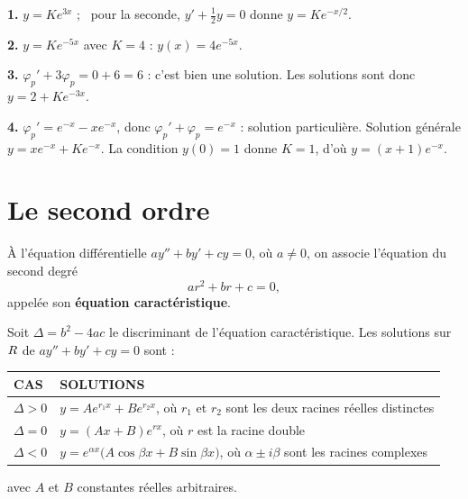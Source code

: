 \begin{corrige}
\textbf{1.} $y = Ke^{3x}$ ; \ pour la seconde, $y' + \tfrac12 y = 0$ donne
$y = Ke^{-x/2}$.

\textbf{2.} $y = Ke^{-5x}$ avec $K = 4$ : $y(x) = 4e^{-5x}$.

\textbf{3.} $\varphi_{p}' + 3\varphi_{p} = 0 + 6 = 6$ : c'est bien une
solution. Les solutions sont donc $y = 2 + Ke^{-3x}$.

\textbf{4.} $\varphi_{p}' = e^{-x} - xe^{-x}$, donc
$\varphi_{p}'+\varphi_{p} = e^{-x}$ : solution particulière. Solution générale
$y = xe^{-x} + Ke^{-x}$. La condition $y(0)=1$ donne $K = 1$, d'où
$y = (x+1)e^{-x}$.
\end{corrige}

\section{Le second ordre}

\begin{definition}
À l'équation différentielle $ay'' + by' + cy = 0$, où $a \neq 0$, on associe
l'équation du second degré
\[
  ar^{2} + br + c = 0,
\]
appelée son \textbf{équation caractéristique}.
\end{definition}

\begin{theoreme}
Soit $\Delta = b^{2}-4ac$ le discriminant de l'équation caractéristique. Les
solutions sur $R$ de $ay''+by'+cy = 0$ sont :

\medskip
\begin{tabular}{@{}p{2.6cm} p{9.6cm}@{}}
\toprule
\textsf{\footnotesize\bfseries CAS} & \textsf{\footnotesize\bfseries SOLUTIONS} \\
\midrule
$\Delta > 0$ & $y = Ae^{r_{1}x} + Be^{r_{2}x}$, où $r_{1}$ et $r_{2}$ sont les
deux racines réelles distinctes \\
$\Delta = 0$ & $y = (Ax+B)e^{rx}$, où $r$ est la racine double \\
$\Delta < 0$ & $y = e^{\alpha x}\bigl(A\cos\beta x + B\sin\beta x\bigr)$, où
$\alpha \pm i\beta$ sont les racines complexes \\
\bottomrule
\end{tabular}

\medskip
\noindent avec $A$ et $B$ constantes réelles arbitraires.
\end{theoreme}

